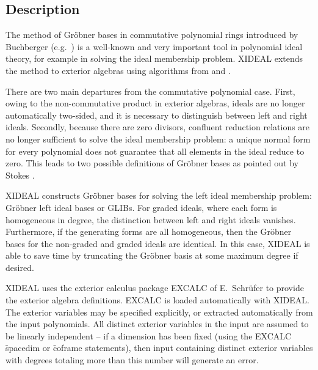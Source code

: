 
\subsection{Description}

The method of Gr{\"o}bner bases in commutative polynomial rings introduced by
Buchberger (e.g.~\cite{Buchberger:85}) is a well-known and very important tool
in polynomial ideal theory, for example in solving the ideal membership
problem. XIDEAL extends the method to exterior algebras using
algorithms from \cite{HartleyTuckey:93} and \cite{Apel:92}.

There are two main departures from the commutative polynomial case. First,
owing to the non-commutative product in exterior algebras, ideals are no
longer automatically two-sided, and it is necessary to distinguish between
left and right ideals. Secondly, because there are zero divisors, confluent
reduction relations are no longer sufficient to solve the ideal membership
problem: a unique normal form for every polynomial does not guarantee that
all elements in the ideal reduce to zero. This leads to two possible
definitions of Gr{\"o}bner bases as pointed out by Stokes \cite{Stokes:90}.

XIDEAL constructs Gr{\"o}bner bases for solving the left ideal membership
problem: Gr{\"o}bner left ideal bases or GLIBs. For graded ideals, where each
form is homogeneous in degree, the distinction between left and right
ideals vanishes. Furthermore, if the generating forms are all homogeneous,
then the Gr{\"o}bner bases for the non-graded and graded ideals are
identical. In this case, XIDEAL is able to save time by truncating the
Gr{\"o}bner basis at some maximum degree if desired.

XIDEAL uses the exterior calculus package EXCALC of E.~Schr{\"u}fer
\cite{Schruefer:85} to provide the exterior algebra definitions. EXCALC is loaded
automatically with XIDEAL.
The exterior variables may be specified explicitly, or extracted
automatically from the input polynomials.  All distinct exterior variables
in the input are assumed to be linearly independent -- if a dimension has
been fixed (using the EXCALC \f{spacedim} or \f{coframe} statements), then
input containing distinct exterior variables with degrees totaling more
than this number will generate an error.

